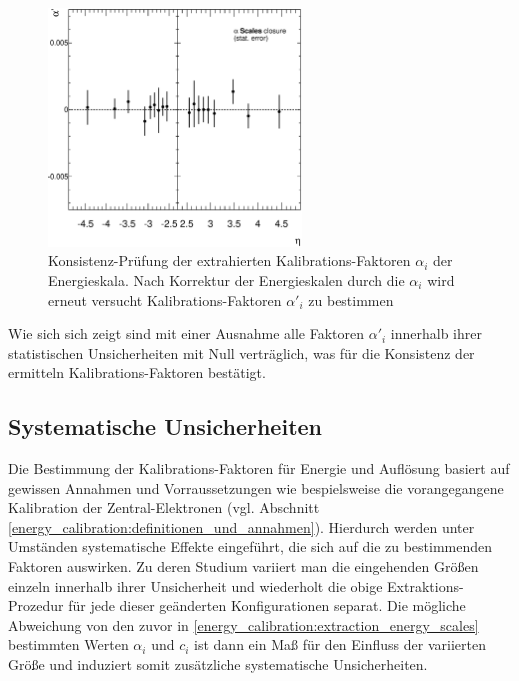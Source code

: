 \begin{figure}
    \centering
    \includegraphics[width=0.6\textwidth]{plots/alpha_2nd}
    \caption[Konsistenz-Prüfung der extrahierten Kalibrations-Faktoren
        $\alpha_i$ der Energieskala]
        {Konsistenz-Prüfung der extrahierten Kalibrations-Faktoren
        $\alpha_i$ der Energieskala. Nach Korrektur der Energieskalen durch die
        $\alpha_i$ wird erneut versucht Kalibrations-Faktoren $\alpha'_i$ zu
        bestimmen}
    \label{fig:alpha_2nd}
\end{figure}

Wie sich sich zeigt sind mit einer Ausnahme alle Faktoren $\alpha'_i$ innerhalb
ihrer statistischen Unsicherheiten mit Null verträglich, was für die Konsistenz
der ermitteln Kalibrations-Faktoren bestätigt.



\subsection{Systematische Unsicherheiten}
\label{energy_calibration:systematics}
Die Bestimmung der Kalibrations-Faktoren für Energie und Auflösung basiert auf
gewissen Annahmen und Vorraussetzungen wie bespielsweise die vorangegangene
Kalibration der Zentral-Elektronen (vgl. Abschnitt
\ref{energy_calibration:definitionen_und_annahmen}).
Hierdurch werden unter Umständen systematische Effekte eingeführt, die sich auf
die zu bestimmenden Faktoren auswirken. Zu deren Studium variiert man die
eingehenden Größen einzeln innerhalb ihrer Unsicherheit und wiederholt die
obige Extraktions-Prozedur für jede dieser geänderten Konfigurationen separat.
Die mögliche Abweichung von den zuvor in
\ref{energy_calibration:extraction_energy_scales} bestimmten Werten $\alpha_i$
und $c_i$ ist dann ein Maß für den Einfluss der variierten Größe und induziert
somit zusätzliche systematische Unsicherheiten.

